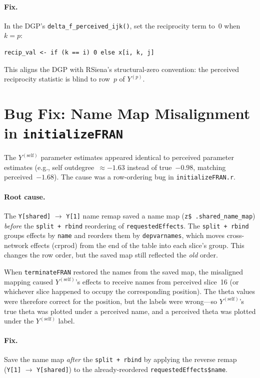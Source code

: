 \documentclass[11pt]{article}
\newcommand{\self}{\mathrm{self}}
\begin{document}
\paragraph{Fix.}
In the DGP's \texttt{delta\_f\_perceived\_ijk()}, set the reciprocity
term to~0 when $k = p$:
\begin{verbatim}
recip_val <- if (k == i) 0 else x[i, k, j]
\end{verbatim}
This aligns the DGP with RSiena's structural-zero convention: the
perceived reciprocity statistic is blind to row~$p$ of $Y^{(p)}$.

\section{Bug Fix: Name Map Misalignment in \texttt{initializeFRAN}}

The $Y^{(\self)}$ parameter estimates appeared identical to perceived
parameter estimates (e.g., self outdegree~$\approx -1.63$ instead of
true~$-0.98$, matching perceived~$-1.68$).
The cause was a row-ordering bug in \texttt{initializeFRAN.r}.

\paragraph{Root cause.}
The \texttt{Y[shared]} $\to$ \texttt{Y[1]} name remap saved a name map
(\texttt{z\$\,.shared\_name\_map}) \emph{before} the
\texttt{split + rbind} reordering of \texttt{requestedEffects}.
The \texttt{split + rbind} groups effects by \texttt{name} and
reorders them by \texttt{depvarnames}, which moves cross-network
effects (crprod) from the end of the table into each slice's group.
This changes the row order, but the saved map still reflected the
\emph{old} order.

When \texttt{terminateFRAN} restored the names from the saved map,
the misaligned mapping caused $Y^{(\self)}$'s effects to receive
names from perceived slice~16 (or whichever slice happened to occupy
the corresponding position). The theta values were therefore correct
for the position, but the labels were wrong---so
$Y^{(\self)}$'s true theta was plotted under a perceived name,
and a perceived theta was plotted under the $Y^{(\self)}$ label.

\paragraph{Fix.}
Save the name map \emph{after} the \texttt{split + rbind} by applying
the reverse remap (\texttt{Y[1]} $\to$ \texttt{Y[shared]}) to the
already-reordered \texttt{requestedEffects\$name}.
\end{document}
